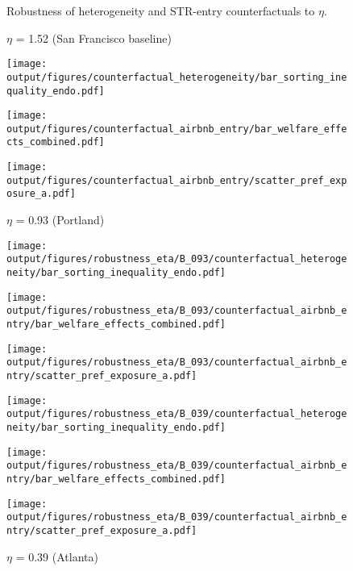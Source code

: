 \documentclass[11pt]{article}
\begin{document}
\begin{figure}[H]
\centering
\caption{Robustness of heterogeneity and STR-entry counterfactuals to $\eta$.}\label{fig: robustness - eta - cf}
\centering
\caption*{$\eta$ = 1.52 (San Francisco baseline)}
\begin{minipage}{0.45\textwidth}
    \centering
    \texttt{[image: output/figures/counterfactual\_heterogeneity/bar\_sorting\_inequality\_endo.pdf]}%
\end{minipage}%
\begin{minipage}{0.225\textwidth}
    \centering
    \texttt{[image: output/figures/counterfactual\_airbnb\_entry/bar\_welfare\_effects\_combined.pdf]}%
\end{minipage}%
\begin{minipage}{0.225\textwidth}
    \centering
    \texttt{[image: output/figures/counterfactual\_airbnb\_entry/scatter\_pref\_exposure\_a.pdf]}%
\end{minipage}%

\caption*{$\eta$ = 0.93 (Portland)}
\begin{minipage}{0.45\textwidth}
    \centering
    \texttt{[image: output/figures/robustness\_eta/B\_093/counterfactual\_heterogeneity/bar\_sorting\_inequality\_endo.pdf]}%
\end{minipage}%
\begin{minipage}{0.225\textwidth}
    \centering
    \texttt{[image: output/figures/robustness\_eta/B\_093/counterfactual\_airbnb\_entry/bar\_welfare\_effects\_combined.pdf]}%
\end{minipage}%
\begin{minipage}{0.225\textwidth}
    \centering
    \texttt{[image: output/figures/robustness\_eta/B\_093/counterfactual\_airbnb\_entry/scatter\_pref\_exposure\_a.pdf]}%
\end{minipage}%

\caption*{$\eta$ = 0.39 (Atlanta)}
\begin{minipage}{0.45\textwidth}
    \centering
    \texttt{[image: output/figures/robustness\_eta/B\_039/counterfactual\_heterogeneity/bar\_sorting\_inequality\_endo.pdf]}%
\end{minipage}%
\begin{minipage}{0.225\textwidth}
    \centering
    \texttt{[image: output/figures/robustness\_eta/B\_039/counterfactual\_airbnb\_entry/bar\_welfare\_effects\_combined.pdf]}%
\end{minipage}%
\begin{minipage}{0.225\textwidth}
    \centering
    \texttt{[image: output/figures/robustness\_eta/B\_039/counterfactual\_airbnb\_entry/scatter\_pref\_exposure\_a.pdf]}%
\end{minipage}%
\end{figure}
\end{document}
